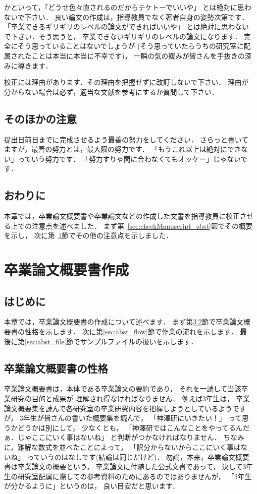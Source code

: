 \documentclass[a4j,12pt,dvipdfmx,oneside]{jsbook}
\theoremstyle{definition}
\begin{document}
かといって，「どうせ色々直されるのだからテケトーでいいや」
とは絶対に思わないで下さい．
良い論文の作成は，指導教員でなく著者自身の姿勢次第です．
「卒業できるギリギリのレベルの論文ができればいいや」
とは絶対に思わないで下さい．そう思うと，
卒業できないギリギリのレベルの論文になります．
完全にそう思っていることはないでしょうが
(そう思っていたらうちの研究室に配属されたことは本当に本当に不幸です)，
一瞬の気の緩みが皆さんを手抜きの深みに導きます．

校正には理由があります．その理由を把握せずに改訂しないで下さい．
理由が分からない場合は必ず，適当な文献を参考にするか質問して下さい．
%
%
%
\section{そのほかの注意}\label{sec:checkManuscript_misc}
提出日前日までに完成させるよう最善の努力をしてください．
さらっと書いてますが，最善の努力とは，最大限の努力です．
「もうこれ以上は絶対にできない」っていう努力です．
「努力すりゃ間に合わなくてもオッケー」じゃないです．
%
%
%
\section{おわりに}\label{sec:checkManuscript_summary}
本章では，卒業論文概要書や卒業論文などの作成した文書を指導教員に校正させ
る上での注意点を述べました．
まず第~\ref{sec:checkManuscript_abst}節でその概要を示し，
次に第~\ref{sec:checkManuscript_misc}節でその他の注意点を示しました．
%
%
%
\chapter{卒業論文概要書作成}\label{chap:abst}
%
%
%
\section{はじめに}\label{sec:abst_intro}
本章では，卒業論文概要書の作成について述べます．
まず第\ref{sec:abst_feature}節で卒業論文概要書の性格を示します．
次に第\ref{sec:abst_flow}節で作業の流れを示します．
最後に第\ref{sec:abst_file}節でサンプルファイルの扱いを示します．
%
%
%
\section{卒業論文概要書の性格}\label{sec:abst_feature}
卒業論文概要書は，本体である卒業論文の要約であり，
それを一読して当該卒業研究の目的と成果が
理解され得なければなりません．
例えば3年生は，
卒業論文概要集を読んで各研究室の卒業研究内容を把握しようとしているようですが，
3年生が皆さんの書いた概要集を読んで，
「神澤研にいきたい！」
って思うかどうかは別にして，
少なくとも，
「神澤研ではこんなことをやってるんだぁ．じゃここにいく事はないね」
と判断がつかなければなりません．
ちなみに，難解な数式を並べたことによって，
「訳分からないからここにいく事はないね」
っていうのはなしです(結論は同じだけど)．
勿論，本来，卒業論文概要書は卒業論文の概要という，
卒業論文に付随した公式文書であって，
決して3年生の研究室配属に際しての参考資料のためにあるのではありませんが，
「3年生が分かるように」というのは，
良い目安だと思います．
\end{document}

